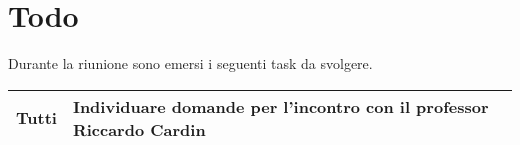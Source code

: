 \section{Todo}
Durante la riunione sono emersi i seguenti task da svolgere.

\begin{center}
  \begin{tabular}{|p{5cm}|p{7cm}|}
    \hline
    Tutti & Individuare domande per l'incontro con il professor Riccardo Cardin \\ \hline
  \end{tabular}
\end{center}
